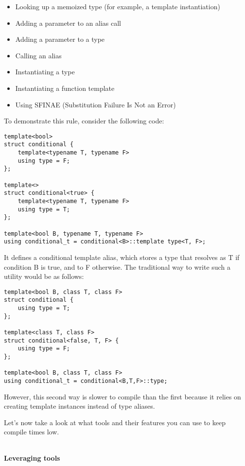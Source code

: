 \begin{itemize}
\item 
Looking up a memoized type (for example, a template instantiation)

\item 
Adding a parameter to an alias call

\item 
Adding a parameter to a type

\item 
Calling an alias

\item 
Instantiating a type

\item 
Instantiating a function template

\item 
Using SFINAE (Substitution Failure Is Not an Error)
\end{itemize}

To demonstrate this rule, consider the following code:

\begin{lstlisting}[style=styleCXX]
template<bool>
struct conditional {
	template<typename T, typename F>
	using type = F;
};

template<>
struct conditional<true> {
	template<typename T, typename F>
	using type = T;
};

template<bool B, typename T, typename F>
using conditional_t = conditional<B>::template type<T, F>;
\end{lstlisting}

It defines a conditional template alias, which stores a type that resolves as T if condition B is true, and to F otherwise. The traditional way to write such a utility would be as follows:

\begin{lstlisting}[style=styleCXX]
template<bool B, class T, class F>
struct conditional {
	using type = T;
};

template<class T, class F>
struct conditional<false, T, F> {
	using type = F;
};

template<bool B, class T, class F>
using conditional_t = conditional<B,T,F>::type;
\end{lstlisting}

However, this second way is slower to compile than the first because it relies on creating template instances instead of type aliases.

Let's now take a look at what tools and their features you can use to keep compile times low.

\hspace*{\fill} \\ %
\noindent
\textbf{Leveraging tools}




